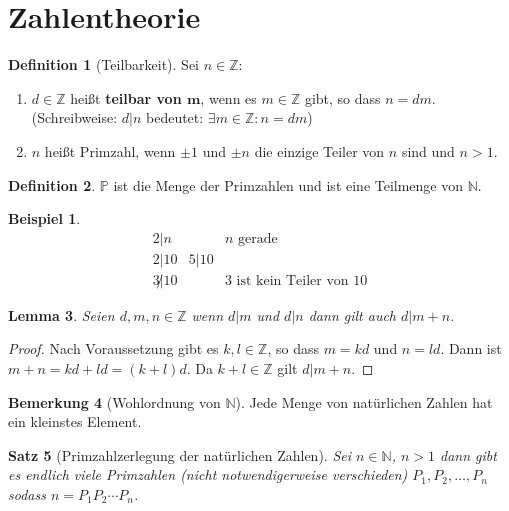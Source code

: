 \documentclass{article}
\theoremstyle{definition}
\newtheorem{definition}{Definition}[section]
\newtheorem{bem}[definition]{Bemerkung}
\newtheorem*{bei*}{Beispiel}
\theoremstyle{plain}
\newtheorem{sa}[definition]{Satz}
\newtheorem{lem}[definition]{Lemma}
\begin{document}
\section{Zahlentheorie}
\begin{definition}[Teilbarkeit]
	Sei $ n \in \mathbb{Z} $:
	\begin{enumerate}
		\item $ d \in \mathbb{Z} $ heißt \textbf{teilbar von $ \mathbf{m} $}, wenn es $ m \in \mathbb{Z} $ gibt, so dass $ n = dm $. (Schreibweise: $ d|n $ bedeutet: $ \exists m \in \mathbb{Z}: n=dm $)
		\item 
		$ n $ heißt Primzahl, wenn $ \pm 1 $ und $ \pm n $ die einzige Teiler von $ n $ sind und $ n > 1 $.
	\end{enumerate}
\end{definition}
\begin{definition}
	$ \mathbb{P} $ ist die Menge der Primzahlen und ist eine Teilmenge von $ \mathbb{N} $.
\end{definition}
\begin{bei*}
	\[ 
	\begin{array}{lll}
		2|n & & n \,\, \text{gerade} \\
		2|10 & 5|10 & \\
		3 \not| 10 & & 3 \,\, \text{ist kein Teiler von} \,\, 10	
	\end{array}
	 \]
\end{bei*}
\begin{lem}
	Seien $ d,m,n \in \mathbb{Z} $ wenn $ d|m $ und $ d|n $ dann gilt auch $ d|m+n $.
\end{lem}
\begin{proof}
	Nach Voraussetzung gibt es $ k,l \in \mathbb{Z} $, so dass $ m = kd $ und $ n = ld $. Dann ist 
	$ m+n = kd + ld = (k+l)d $. Da $ k+l \in \mathbb{Z} $ gilt $ d|m+n $.
\end{proof}
\begin{bem}[Wohlordnung von $ \mathbb{N} $] \label{12}
	Jede Menge von natürlichen Zahlen hat ein kleinstes Element.
\end{bem}
\begin{sa}[Primzahlzerlegung der natürlichen Zahlen]\label{21}
	Sei $ n \in \mathbb{N} $, $ n>1 $ dann gibt es endlich viele Primzahlen (nicht notwendigerweise verschieden) $ P_1 , P_2 , \ldots , P_n $ sodass $ n = P_1 P_2 \cdots P_n $.
\end{sa}
\end{document}
